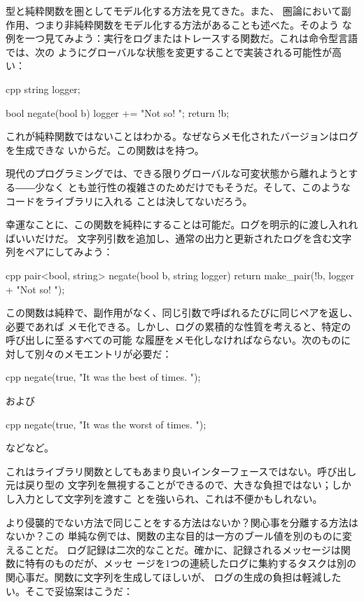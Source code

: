 
\lettrine[lhang=0.17]{型}{と純粋関数を}圏としてモデル化する方法を見てきた。また、
圏論において副作用、つまり非純粋関数をモデル化する方法があることも述べた。そのよう
な例を一つ見てみよう：実行をログまたはトレースする関数だ。これは命令型言語では、次の
ようにグローバルな状態を変更することで実装される可能性が高い：

\begin{snip}{cpp}
string logger;

bool negate(bool b) {
    logger += "Not so! ";
    return !b;
}
\end{snip}
これが純粋関数ではないことはわかる。なぜならメモ化されたバージョンはログを生成できな
いからだ。この関数はを持つ。

現代のプログラミングでは、できる限りグローバルな可変状態から離れようとする――少なく
とも並行性の複雑さのためだけでもそうだ。そして、このようなコードをライブラリに入れる
ことは決してないだろう。

幸運なことに、この関数を純粋にすることは可能だ。ログを明示的に渡し入れればいいだけだ。
文字列引数を追加し、通常の出力と更新されたログを含む文字列をペアにしてみよう：

\begin{snip}{cpp}
pair<bool, string> negate(bool b, string logger) {
    return make_pair(!b, logger + "Not so! ");
}
\end{snip}
この関数は純粋で、副作用がなく、同じ引数で呼ばれるたびに同じペアを返し、必要であれば
メモ化できる。しかし、ログの累積的な性質を考えると、特定の呼び出しに至るすべての可能
な履歴をメモ化しなければならない。次のものに対して別々のメモエントリが必要だ：

\begin{snip}{cpp}
negate(true, "It was the best of times. ");
\end{snip}
および

\begin{snip}{cpp}
negate(true, "It was the worst of times. ");
\end{snip}
などなど。

これはライブラリ関数としてもあまり良いインターフェースではない。呼び出し元は戻り型の
文字列を無視することができるので、大きな負担ではない；しかし入力として文字列を渡すこ
とを強いられ、これは不便かもしれない。

より侵襲的でない方法で同じことをする方法はないか？関心事を分離する方法はないか？この
単純な例では、関数の主な目的は一方のブール値を別のものに変えることだ。
ログ記録は二次的なことだ。確かに、記録されるメッセージは関数に特有のものだが、メッセ
ージを1つの連続したログに集約するタスクは別の関心事だ。関数に文字列を生成してほしいが、
ログの生成の負担は軽減したい。そこで妥協案はこうだ：

